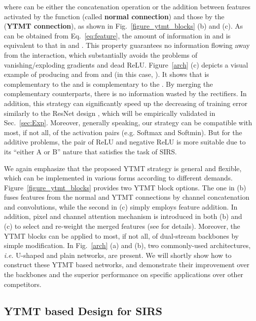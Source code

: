 \documentclass{article}
\begin{document}
where  can be either the concatenation operation or the addition between features activated by the  function (called \textbf{normal connection}) and those by the  (\textbf{YTMT connection}), as shown in Fig.~\ref{figure_ytmt_blocks} (b) and (c). As can be obtained from Eq.~\eqref{eq:feature}, the amount of information in  and  is equivalent to that in  and . This property guarantees no information flowing away from the interaction, which substantially avoids the problems of vanishing/exploding gradients and dead ReLU. Figure~\ref{arch} (c) depicts a visual example of producing  and  from  and  (in this case, ). It shows that  is complementary to the  and  is complementary to the . By merging the complementary counterparts, there is no information wasted by the rectifiers.  In addition, this strategy can significantly speed up the decreasing of training error similarly to the ResNet design \cite{DBLP:conf/cvpr/HeZRS16}, which will be empirically validated in Sec.~\ref{sec:Exp}. Moreover, generally speaking, our strategy can be compatible with most, if not all, of the activation pairs (e.g. Softmax and Softmin). But for the additive problems, the pair of ReLU and negative ReLU is more suitable due to its ``either A or B'' nature that satisfies the task of SIRS. 

We again emphasize that the proposed YTMT strategy is general and flexible, which can be implemented in various forms according to different demands. Figure~\ref{figure_ytmt_blocks} provides two YTMT block options. The one in (b) fuses features from the normal and YTMT connections by channel concatenation and  convolutions, while the second in (c) simply employs feature addition. In addition, pixel and channel attention mechanism is introduced in both (b) and (c) to select and re-weight the merged features (see \cite{DBLP:conf/aaai/QinWBXJ20} for details). Moreover, the YTMT blocks can be applied to most, if not all, of dual-stream backbones by simple modification. In Fig.~\ref{arch} (a) and (b), two commonly-used architectures, \emph{i.e.} U-shaped \cite{DBLP:conf/miccai/RonnebergerFB15} and plain \cite{DBLP:journals/tip/ZhangZCM017} networks, are present. We will shortly show how to construct these YTMT based networks, and demonstrate their improvement over the backbones and the superior performance on specific applications over other competitors.

\subsection{YTMT based Design for SIRS}
\label{sec:sirs_design}
\end{document}
